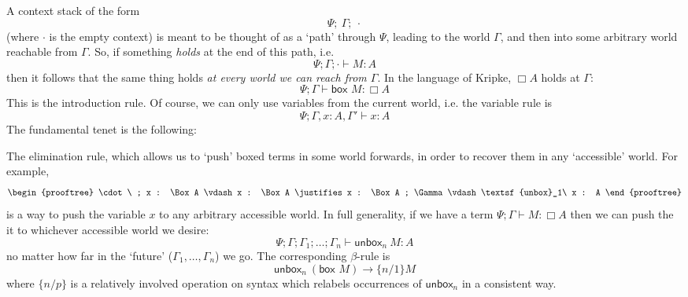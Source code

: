 \documentclass[a4paper]{amsart}
\begin{document}
A context stack of the form \[
  \Psi ;\ \Gamma ;\ \cdot
\] (where $\cdot$ is the empty context) is meant to be thought of
as a `path' through $\Psi$, leading to the world $\Gamma$, and then
into some arbitrary world reachable from $\Gamma$.  So, if
something \emph{holds} at the end of this path, i.e. \[
  \Psi ; \Gamma ; \cdot \vdash M : A
\] then it follows that the same thing holds \emph{at every world
we can reach from $\Gamma$}. In the language of Kripke, $\Box A$
holds at $\Gamma$: \[
  \Psi ; \Gamma \vdash \textsf{box } M : \Box A
\] This is the introduction rule. Of course, we can only use
variables from the current world, i.e. the variable rule is \[
  \Psi ; \Gamma, x{:}A, \Gamma' \vdash x : A
\] The fundamental tenet is the following: \begin{center}
\end{center} The elimination rule, which allows us to `push' boxed
terms in some world forwards, in order to recover them in any
`accessible' world. For example, \[
\begin{prooftree}
  \cdot\ ; x : \Box A \vdash x : \Box A
    \justifies
  x : \Box A ; \Gamma \vdash \textsf{unbox}_1\ x : A
\end{prooftree} \] is a way to push the variable $x$ to any
arbitrary accessible world.  In full generality, if we have a
term $\Psi ; \Gamma \vdash M : \Box A$ then we can push
the it to whichever accessible world we desire: \[
  \Psi ; \Gamma ; \Gamma_1 ; \dots ; \Gamma_n \vdash
    \textsf{unbox}_n\ M : A
\] no matter how far in the `future' ($\Gamma_1, \dots, \Gamma_n$)
we go. The corresponding $\beta$-rule is \[
  \textsf{unbox}_n\ (\textsf{box } M) \longrightarrow
    \{n/1\}M
\] where $\{n/p\}$ is a relatively involved operation on syntax
which relabels occurrences of $\textsf{unbox}_n$ in a consistent
way.
\end{document}
